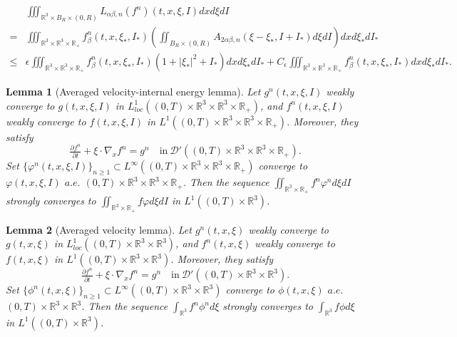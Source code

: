 \documentclass[10pt,a4paper]{amsart}
\newtheorem{lemma}{Lemma}
\def\R{\mathbb{R}}
\begin{document}
\begin{equation}\label{Trans-fab}
	\begin{aligned}	
		& \iiint_{\R^3 \times B_R \times (0,R)} L_{ \alpha \beta ,n} (f^n) (t,x,\xi, I) dxd\xi dI \\
= & \iiint_{\R^3 \times \R^3 \times \R_+}f^n_{\beta} (t,x,\xi_*, I_*) ( \iint_{B_R \times (0,R)}  A_{2\alpha \beta ,n}(\xi-\xi_*,I+I_*) d\xi dI ) dxd\xi_* dI_* \\
			\leq & \epsilon \iiint_{\R^3 \times \R^3 \times \R_+} f^n_{\beta} (t,x ,\xi_*, I_*) (1+|\xi_*|^2 +I_*) dxd\xi_* dI_* + C_\epsilon \iiint_{\R^3 \times \R^3 \times \R_+} f^n_{\beta} (t,x, \xi_*, I_*) dxd\xi_* dI_*.
		\end{aligned}
	\end{equation}

\begin{lemma}[Averaged velocity-internal energy lemma]\label{theo-6.2}
Let $g^n (t,x, \xi, I)$ weakly converge to $g (t,x, \xi, I)$ in $ L^1_{loc} ((0,T)\times \R^3 \times \R^3 \times \R_+) $, and $f^n (t,x, \xi, I)$ weakly converge to $f (t, x, \xi, I)$ in $L^1 ( (0,T)\times \R^3 \times \R^3 \times \R_+ )$. Moreover, they satisfy
	\begin{equation*}
		\tfrac{\partial f^n}{\partial t} +\xi \cdot \nabla_x f^n = g^n \quad \text{in}\ \mathscr{D}' ((0,T) \times \R^3 \times \R^3 \times \R_+) .
	\end{equation*}
Set $\{\varphi^n (t, x, \xi, I) \}_{n\geq 1} \subset L^\infty ((0,T)\times \R^3 \times \R^3 \times \R_+)$ converge to $\varphi (t, x, \xi, I)$ $a.e.$ $(0,T)\times \R^3 \times \R^3 \times \R_+$. Then the sequence $\iint_{\R^3\times \R_+} f^n\varphi^n d\xi dI$ strongly converges to $\iint_{\R^3\times \R_+} f \varphi d\xi dI$ in $L^1((0,T)\times \R^3)$.
\end{lemma}

\begin{lemma}[Averaged velocity lemma]\label{theo-6.2.1}
Let $g^n (t,x, \xi)$ weakly converge to $g (t, x, \xi)$ in $L^1_{loc} ( (0,T) \times \R^3 \times \R^3 )$, and $ f^n (t, x, \xi) $ weakly converge to $f (t, x, \xi)$ in $L^1 ( (0,T) \times \R^3 \times \R^3 )$. Moreover, they satisfy
	\begin{equation*}
		\tfrac{\partial f^n}{\partial t} +\xi \cdot \nabla_x f^n = g^n \quad \text{in}\ \mathscr{D}' ((0,T) \times \R^3 \times \R^3 ) .
	\end{equation*}
Set $\{\phi^n (t,x, \xi)\}_{n\geq 1} \subset L^\infty ((0,T)\times \R^3 \times \R^3 )$ converge to $ \phi (t, x, \xi) $ $a. e.$ $(0,T) \times \R^3 \times \R^3$. Then the sequence $\int_{\R^3} f^n\phi^n d\xi $ strongly converges to $ \int_{\R^3 } f \phi d\xi $ in $L^1((0,T)\times \R^3)$.
\end{lemma}
\end{document}
